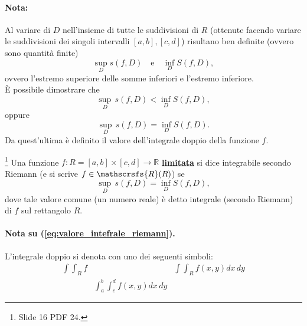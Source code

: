 \paragraph{Nota:} Al variare di $D$ nell'insieme di tutte le suddivisioni di $R$ (ottenute facendo variare le suddivisioni dei singoli intervalli $[a,b], [c,d]$) risultano ben definite (ovvero sono quantità finite)
\begin{equation*}
	\underset{D}{\sup} s(f,D)\quad\text{e}\quad \underset{D}{\inf} S(f,D),
\end{equation*}
ovvero l'estremo superiore delle somme inferiori e l'estremo inferiore.\\
È possibile dimostrare che 
\begin{equation*}
	\underset{D}{\sup} \, s(f,D) < \underset{D}{\inf} S(f,D),
\end{equation*}
oppure
\begin{equation*}
	\underset{D}{\sup} \, s(f,D) = \underset{D}{\inf} S(f,D).
\end{equation*}
Da quest'ultima è definito il valore dell'integrale doppio della funzione $f$.

\begin{definition}\footnote{Slide 16 PDF 24.}
	Una funzione $f:R=[a,b]\times [c,d]\rightarrow\mathbb{R}$ \textbf{\ul{limitata}} si dice integrabile secondo Riemann (e si scrive $f\in \mathscrsfs{R}(R)$) se
	\begin{equation}\label{eq:valore_intefrale_riemann}
		\underset{D}{\sup} \, s(f,D) = \underset{D}{\inf} S(f,D),
	\end{equation}
	dove tale valore comune (un numero reale) è detto integrale (secondo Riemann) di $f$ sul rettangolo $R$.
\end{definition}

\paragraph{Nota su (\ref{eq:valore_intefrale_riemann}).} L'integrale doppio si denota con uno dei seguenti simboli:
\begin{equation*}
	\begin{aligned}
		\int\int_R f & &\int\int_R f(x,y)dx\, dy\\
		& \int^b_a\int^d_c f(x,y) dx\, dy&
	\end{aligned}
\end{equation*}

